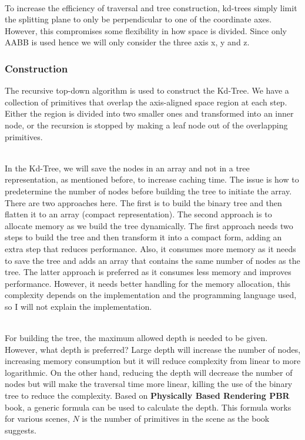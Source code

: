 \documentclass[11pt,a4paper]{article}
\begin{document}
\noindent
\\
To increase the efficiency of traversal and tree construction, kd-trees simply limit the splitting plane to only be perpendicular to one of the coordinate axes. However, this compromises some flexibility in how space is divided. Since only AABB is used hence we will only consider the three axis x, y and z.

\subsubsection{Construction}

The recursive top-down algorithm is used to construct the Kd-Tree. We have a collection of primitives that overlap the axis-aligned space region at each step. Either the region is divided into two smaller ones and transformed into an inner node, or the recursion is stopped by making a leaf node out of the overlapping primitives.

\noindent
\\
In the Kd-Tree, we will save the nodes in an array and not in a tree representation, as mentioned before, to increase caching time. The issue is how to predetermine the number of nodes before building the tree to initiate the array. There are two approaches here. The first is to build the binary tree and then flatten it to an array (compact representation). The second approach is to allocate memory as we build the tree dynamically. The first approach needs two steps to build the tree and then transform it into a compact form, adding an extra step that reduces performance. Also, it consumes more memory as it needs to save the tree and adds an array that contains the same number of nodes as the tree. The latter approach is preferred as it consumes less memory and improves performance. However, it needs better handling for the memory allocation, this complexity depends on the implementation and the programming language used, so I will not explain the implementation. 

\noindent
\\
For building the tree, the maximum allowed depth is needed to be given. However, what depth is preferred? Large depth will increase the number of nodes, increasing memory consumption but it will reduce complexity from linear to more logarithmic. On the other hand, reducing the depth will decrease the number of nodes but will make the traversal time more linear, killing the use of the binary tree to reduce the complexity. Based on \textbf{Physically Based Rendering PBR} \protect\cite{Pharr2016} book, a generic formula can be used to calculate the depth. This formula works for various scenes, $N$ is the number of primitives in the scene as the book suggests. 
\end{document}
